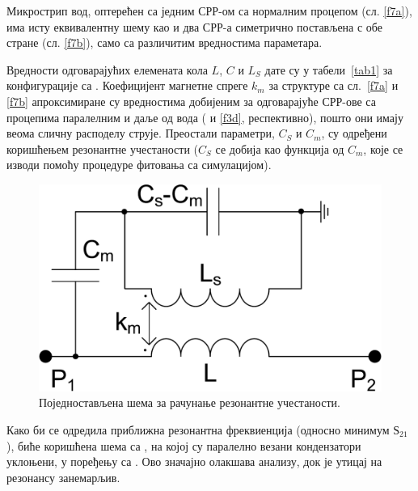 \documentclass[main.tex]{subfiles}
\begin{document}
Микрострип вод, оптерећен са једним СРР-ом са нормалним процепом (сл. \ref{f7a}), има исту еквивалентну шему као и два СРР-а симетрично постављена с обе стране (сл. \ref{f7b}), само са различитим вредностима параметара.

Вредности одговарајућих елемената кола $L$, $C$ и $L_S$ дате су у табели~\ref{tab1} за конфигурације са . Коефицијент магнетне спреге $k_m$ за структуре са сл.~\ref{f7a} и \ref{f7b} апроксимиране су вредностима добијеним за одговарајуће СРР-ове са процепима паралелним и даље од вода ( и \ref{f3d}, респективно), пошто они имају веома сличну расподелу струје. Преостали параметри, $C_S$ и $C_m$, су одређени коришћењем резонантне учестаности ($C_S$ се добија као функција од $C_m$, које се изводи помоћу процедуре фитовања са симулацијом).

\begin{figure}[!t]
\centering
\includegraphics[width=0.4\columnwidth]{sl_ekv/fig8}
\caption{Поједностављена шема за рачунање резонантне учестаности.}
\label{f8}
\end{figure}
Како би се одредила приближна резонантна фреквиенција (односно минимум $Ѕ_{21}$), биће коришћена шема са , на којој су паралелно везани кондензатори уклоњени, у поређењу са . Ово значајно олакшава анализу, док је утицај на резонансу занемарљив.
\end{document}
